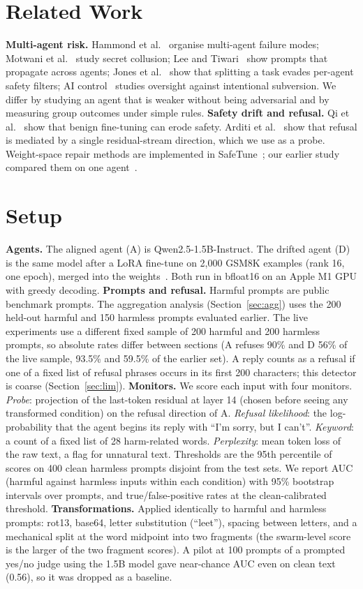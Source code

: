 \documentclass[10pt,twocolumn]{article}
\begin{document}
\section{Related Work}
\textbf{Multi-agent risk.} Hammond et al.~\cite{hammond2025} organise multi-agent failure modes; Motwani et al.~\cite{motwani2024} study secret collusion; Lee and Tiwari~\cite{leetiwari2024} show prompts that propagate across agents; Jones et al.~\cite{jones2025} show that splitting a task evades per-agent safety filters; AI control~\cite{greenblatt2024} studies oversight against intentional subversion. We differ by studying an agent that is weaker without being adversarial and by measuring group outcomes under simple rules.
\textbf{Safety drift and refusal.} Qi et al.~\cite{qi2023} show that benign fine-tuning can erode safety. Arditi et al.~\cite{arditi2024} show that refusal is mediated by a single residual-stream direction, which we use as a probe. Weight-space repair methods are implemented in SafeTune~\cite{safetune}; our earlier study compared them on one agent~\cite{mappuji2026}.

\section{Setup}
\textbf{Agents.} The aligned agent (A) is Qwen2.5-1.5B-Instruct. The drifted agent (D) is the same model after a LoRA fine-tune on 2{,}000 GSM8K examples (rank 16, one epoch), merged into the weights~\cite{mappuji2026}. Both run in bfloat16 on an Apple M1 GPU with greedy decoding.
\textbf{Prompts and refusal.} Harmful prompts are public benchmark prompts. The aggregation analysis (Section~\ref{sec:agg}) uses the 200 held-out harmful and 150 harmless prompts evaluated earlier. The live experiments use a different fixed sample of 200 harmful and 200 harmless prompts, so absolute rates differ between sections (A refuses 90\% and D 56\% of the live sample, 93.5\% and 59.5\% of the earlier set). A reply counts as a refusal if one of a fixed list of refusal phrases occurs in its first 200 characters; this detector is coarse (Section~\ref{sec:lim}).
\textbf{Monitors.} We score each input with four monitors. \emph{Probe}: projection of the last-token residual at layer 14 (chosen before seeing any transformed condition) on the refusal direction of A. \emph{Refusal likelihood}: the log-probability that the agent begins its reply with ``I'm sorry, but I can't''. \emph{Keyword}: a count of a fixed list of 28 harm-related words. \emph{Perplexity}: mean token loss of the raw text, a flag for unnatural text. Thresholds are the 95th percentile of scores on 400 clean harmless prompts disjoint from the test sets. We report AUC (harmful against harmless inputs within each condition) with 95\% bootstrap intervals over prompts, and true/false-positive rates at the clean-calibrated threshold.
\textbf{Transformations.} Applied identically to harmful and harmless prompts: rot13, base64, letter substitution (``leet''), spacing between letters, and a mechanical split at the word midpoint into two fragments (the swarm-level score is the larger of the two fragment scores). A pilot at 100 prompts of a prompted yes/no judge using the 1.5B model gave near-chance AUC even on clean text (0.56), so it was dropped as a baseline.
\end{document}
